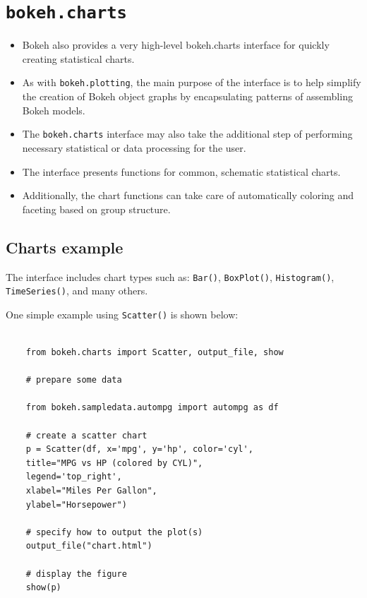 \documentclass[a4paper,12pt]{article}
\begin{document}
\section*{\texttt{bokeh.charts}}
\begin{itemize}
	\item Bokeh also provides a very high-level bokeh.charts interface for quickly creating statistical charts. 
	\item As with \texttt{bokeh.plotting}, the main purpose of the interface is to help simplify the creation of Bokeh object graphs by encapsulating patterns of assembling Bokeh models. 
	\item The \texttt{bokeh.charts} interface may also take the additional step of performing necessary statistical or data processing for the user. 
	
	\item The interface presents functions for common, schematic statistical charts. \item Additionally, the chart functions can take care of automatically coloring and faceting based on group structure.
\end{itemize}

\newpage

\subsection*{Charts example}
The interface includes chart types such as: \texttt{Bar()}, \texttt{BoxPlot()}, \texttt{Histogram()}, \texttt{TimeSeries()}, and many others. 

One simple example using \texttt{Scatter()} is shown below:
{
	\begin{verbatim}
	
	from bokeh.charts import Scatter, output_file, show
	
	# prepare some data
	
	from bokeh.sampledata.autompg import autompg as df
	
	# create a scatter chart
	p = Scatter(df, x='mpg', y='hp', color='cyl',
	title="MPG vs HP (colored by CYL)",
	legend='top_right',
	xlabel="Miles Per Gallon",
	ylabel="Horsepower")
	
	# specify how to output the plot(s)
	output_file("chart.html")
	
	# display the figure
	show(p)
	\end{verbatim}
	
}
\end{document}
